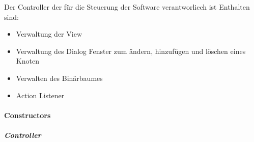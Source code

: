 \documentclass[letterpaper,10pt,ngerman]{sphinxmanual}
\begin{document}
\begin{fulllineitems}
\label{\detokenize{com/linuxluigi/edu/Controller:com.linuxluigi.edu.Controller}}
Der Controller der für die Steuerung der Software verantworlicch ist Enthalten sind:
\begin{itemize}
\item {} 
Verwaltung der View

\item {} 
Verwaltung des Dialog Fenster zum ändern, hinzufügen und löschen eines Knoten

\item {} 
Verwalten des Binärbaumes

\item {} 
Action Listener

\end{itemize}

\end{fulllineitems}



\paragraph{Constructors}
\label{\detokenize{com/linuxluigi/edu/Controller:constructors}}

\subparagraph{Controller}
\label{\detokenize{com/linuxluigi/edu/Controller:id1}}
\end{document}
